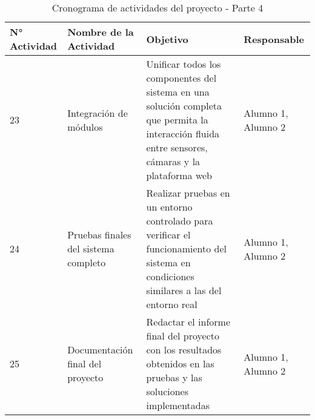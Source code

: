 \begin{table}[H]
    \centering
    \renewcommand{\arraystretch}{1.5}
    \begin{tabular}{ |p{1.5cm}|p{5cm}|p{5.5cm}|p{2.5cm}| }

        \hline
        \textbf{N° Actividad} & \textbf{Nombre de la Actividad} & \textbf{Objetivo} & \textbf{Responsable} \\
        \hline

        23 & Integración de módulos & Unificar todos los componentes del sistema en una solución completa que permita la interacción fluida entre sensores, cámaras y la plataforma web & Alumno 1, Alumno 2 \\\hline
        24 & Pruebas finales del sistema completo & Realizar pruebas en un entorno controlado para verificar el funcionamiento del sistema en condiciones similares a las del entorno real & Alumno 1, Alumno 2 \\\hline
        25 & Documentación final del proyecto & Redactar el informe final del proyecto con los resultados obtenidos en las pruebas y las soluciones implementadas & Alumno 1, Alumno 2 \\\hline

    \end{tabular}
    \caption{Cronograma de actividades del proyecto - Parte 4}
    \label{tab:cronograma_proyecto_parte4}
\end{table}
